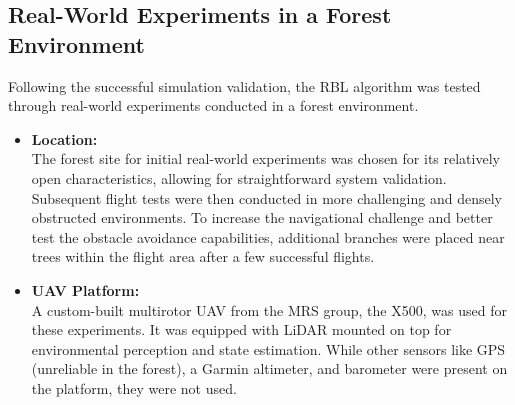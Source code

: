         \subsection{Real-World Experiments in a Forest Environment}
            Following the successful simulation validation, the \ac{RBL} algorithm was tested through real-world experiments conducted in a forest environment.
            \begin{itemize}
                \item \textbf{Location: } \\
                    The forest site for initial real-world experiments was chosen for its relatively open characteristics, allowing for straightforward system validation. 
                    Subsequent flight tests were then conducted in more challenging and densely obstructed environments.
                    To increase the navigational challenge and better test the obstacle avoidance capabilities, additional branches were placed near trees within the flight area after a few successful flights. 
                \item \textbf{UAV Platform: } \\
                    A custom-built multirotor \ac{UAV} from the \ac{MRS} group, the X500, was used for these experiments.
                    It was equipped with LiDAR mounted on top for environmental perception and state estimation.
                    While other sensors like GPS (unreliable in the forest), a Garmin altimeter, and barometer were present on the platform, they were not used.

\end{itemize}
